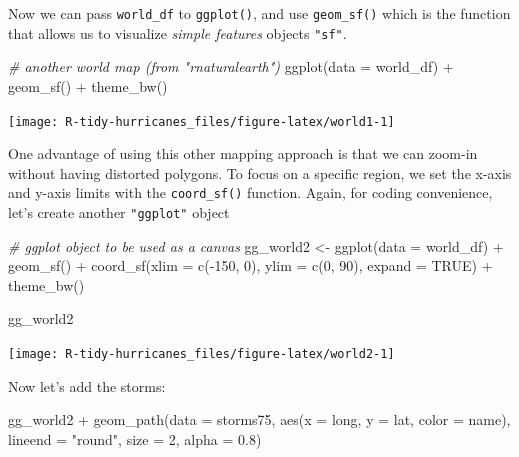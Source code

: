 \documentclass[
]{book}
\newenvironment{Shaded}{\begin{snugshade}}{\end{snugshade}}
\newcommand{\AttributeTok}[1]{\textcolor[rgb]{0.77,0.63,0.00}{#1}}
\newcommand{\CommentTok}[1]{\textcolor[rgb]{0.56,0.35,0.01}{\textit{#1}}}
\newcommand{\ConstantTok}[1]{\textcolor[rgb]{0.00,0.00,0.00}{#1}}
\newcommand{\DecValTok}[1]{\textcolor[rgb]{0.00,0.00,0.81}{#1}}
\newcommand{\FloatTok}[1]{\textcolor[rgb]{0.00,0.00,0.81}{#1}}
\newcommand{\FunctionTok}[1]{\textcolor[rgb]{0.00,0.00,0.00}{#1}}
\newcommand{\NormalTok}[1]{#1}
\newcommand{\OtherTok}[1]{\textcolor[rgb]{0.56,0.35,0.01}{#1}}
\newcommand{\SpecialCharTok}[1]{\textcolor[rgb]{0.00,0.00,0.00}{#1}}
\newcommand{\StringTok}[1]{\textcolor[rgb]{0.31,0.60,0.02}{#1}}
\begin{document}
Now we can pass \texttt{world\_df} to \texttt{ggplot()}, and use \texttt{geom\_sf()} which is the
function that allows us to visualize \emph{simple features} objects \texttt{"sf"}.

\begin{Shaded}
\begin{Highlighting}[]
\CommentTok{\# another world map (from "rnaturalearth")}
\FunctionTok{ggplot}\NormalTok{(}\AttributeTok{data =}\NormalTok{ world\_df) }\SpecialCharTok{+}
  \FunctionTok{geom\_sf}\NormalTok{() }\SpecialCharTok{+} 
  \FunctionTok{theme\_bw}\NormalTok{()}
\end{Highlighting}
\end{Shaded}

\begin{center}\texttt{[image: R-tidy-hurricanes\_files/figure-latex/world1-1]} \end{center}

One advantage of using this other mapping approach is that we can zoom-in
without having distorted polygons. To focus on a specific region, we set the
x-axis and y-axis limits with the \texttt{coord\_sf()} function. Again, for coding
convenience, let's create another \texttt{"ggplot"} object

\begin{Shaded}
\begin{Highlighting}[]
\CommentTok{\# ggplot object to be used as a canvas}
\NormalTok{gg\_world2 }\OtherTok{\textless{}{-}} \FunctionTok{ggplot}\NormalTok{(}\AttributeTok{data =}\NormalTok{ world\_df) }\SpecialCharTok{+}
  \FunctionTok{geom\_sf}\NormalTok{() }\SpecialCharTok{+} 
  \FunctionTok{coord\_sf}\NormalTok{(}\AttributeTok{xlim =} \FunctionTok{c}\NormalTok{(}\SpecialCharTok{{-}}\DecValTok{150}\NormalTok{, }\DecValTok{0}\NormalTok{), }\AttributeTok{ylim =} \FunctionTok{c}\NormalTok{(}\DecValTok{0}\NormalTok{, }\DecValTok{90}\NormalTok{), }\AttributeTok{expand =} \ConstantTok{TRUE}\NormalTok{) }\SpecialCharTok{+}
  \FunctionTok{theme\_bw}\NormalTok{()}

\NormalTok{gg\_world2}
\end{Highlighting}
\end{Shaded}

\begin{center}\texttt{[image: R-tidy-hurricanes\_files/figure-latex/world2-1]} \end{center}

Now let's add the storms:

\begin{Shaded}
\begin{Highlighting}[]
\NormalTok{gg\_world2 }\SpecialCharTok{+} 
  \FunctionTok{geom\_path}\NormalTok{(}\AttributeTok{data =}\NormalTok{ storms75,}
            \FunctionTok{aes}\NormalTok{(}\AttributeTok{x =}\NormalTok{ long, }\AttributeTok{y =}\NormalTok{ lat, }\AttributeTok{color =}\NormalTok{ name),}
            \AttributeTok{lineend =} \StringTok{"round"}\NormalTok{, }\AttributeTok{size =} \DecValTok{2}\NormalTok{, }\AttributeTok{alpha =} \FloatTok{0.8}\NormalTok{)}
\end{Highlighting}
\end{Shaded}
\end{document}
